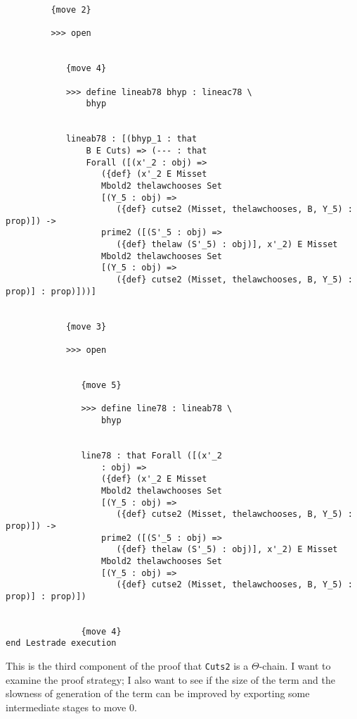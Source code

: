 \documentclass[12pt]{article}
\begin{document}
\begin{verbatim}
         {move 2}

         >>> open


            {move 4}

            >>> define lineab78 bhyp : lineac78 \
                bhyp


            lineab78 : [(bhyp_1 : that 
                B E Cuts) => (--- : that 
                Forall ([(x'_2 : obj) => 
                   ({def} (x'_2 E Misset 
                   Mbold2 thelawchooses Set 
                   [(Y_5 : obj) => 
                      ({def} cutse2 (Misset, thelawchooses, B, Y_5) : prop)]) -> 
                   prime2 ([(S'_5 : obj) => 
                      ({def} thelaw (S'_5) : obj)], x'_2) E Misset 
                   Mbold2 thelawchooses Set 
                   [(Y_5 : obj) => 
                      ({def} cutse2 (Misset, thelawchooses, B, Y_5) : prop)] : prop)]))]


            {move 3}

            >>> open


               {move 5}

               >>> define line78 : lineab78 \
                   bhyp


               line78 : that Forall ([(x'_2 
                   : obj) => 
                   ({def} (x'_2 E Misset 
                   Mbold2 thelawchooses Set 
                   [(Y_5 : obj) => 
                      ({def} cutse2 (Misset, thelawchooses, B, Y_5) : prop)]) -> 
                   prime2 ([(S'_5 : obj) => 
                      ({def} thelaw (S'_5) : obj)], x'_2) E Misset 
                   Mbold2 thelawchooses Set 
                   [(Y_5 : obj) => 
                      ({def} cutse2 (Misset, thelawchooses, B, Y_5) : prop)] : prop)])


               {move 4}
end Lestrade execution
\end{verbatim}

This is the third component of the proof that {\tt Cuts2} is a $\Theta$-chain.  I want to examine the proof strategy;  I also want to see if the size of the term and the slowness of generation of the term can be improved by exporting some intermediate stages to move 0.
\end{document}
